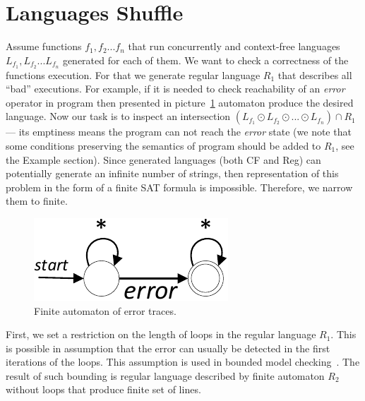 
\section{Languages Shuffle}


Assume functions $f_1, f_2 ... f_n$ that run concurrently and context-free languages $ L_{f_1}, L_{f_2} ... L_{f_n}$
generated for each of them. We want to check a correctness of the functions execution. For that
we generate regular language $R_1$ that describes all ``bad'' executions. For example, if it is needed
to check reachability of an \textit{error} operator in program then presented in picture~\ref{ErrorStarAutomaton} automaton 
produce the desired language.
Now our task is to inspect an intersection $ (L_{f_1} \odot L_{f_2} \odot... \odot L_{f_n})\cap R_1$ --- its
emptiness means the program can not reach the \textit{error} state (we note that some conditions preserving the semantics of program
should be added to $R_1$, see the Example section).
Since generated languages (both CF and Reg) can potentially generate an infinite number of strings, then representation 
of this problem in the form of a finite SAT formula is impossible. Therefore, we narrow them to finite.
\begin{figure}[ht]
	\centering
	\includegraphics[scale=.6]{pic/ErrorStarAutomaton.pdf}
	\caption{Finite automaton of error traces.}
	\label{ErrorStarAutomaton}
\end{figure}




First, we set a restriction on the length of loops in the regular language $ R_1 $. This is possible in assumption
that the error can usually be detected in the first iterations of the loops. This assumption is used in bounded model
checking~\cite{BMC}.%
The result of such bounding 
is regular language described by finite automaton $R_2$ without loops that produce finite set of lines.

